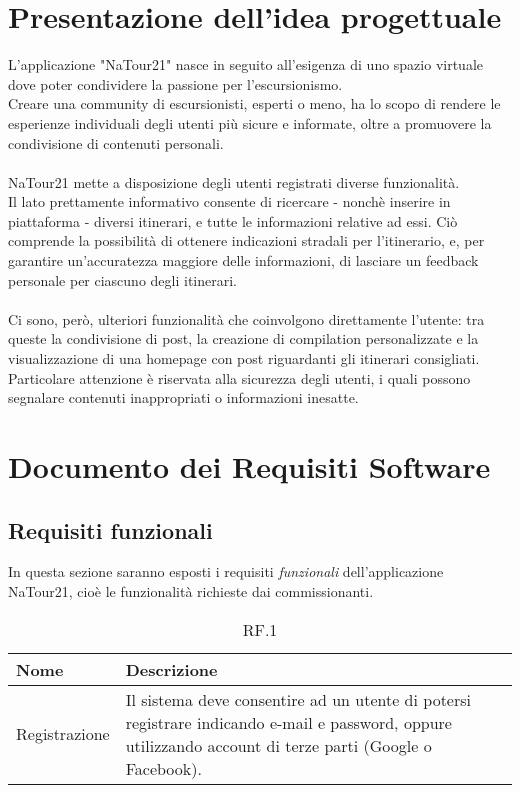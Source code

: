 \documentclass{natourDoc}
\begin{document}
	\section{Presentazione dell'idea progettuale}

	L'applicazione "NaTour21" nasce in seguito all'esigenza di uno spazio virtuale dove poter condividere la passione per l'escursionismo.\\
	Creare una community di escursionisti, esperti o meno, ha lo scopo di rendere le esperienze individuali degli utenti più sicure e informate, 
	oltre a promuovere la condivisione di contenuti personali.\\\\
	NaTour21 mette a disposizione degli utenti registrati diverse funzionalità.\\
	Il lato prettamente informativo consente di ricercare - nonchè inserire in piattaforma - diversi itinerari, e tutte le informazioni relative ad essi.
	Ciò comprende la possibilità di ottenere indicazioni stradali per l'itinerario, e, per garantire un'accuratezza maggiore delle informazioni, di lasciare 
	un feedback personale per ciascuno degli itinerari.\\\\
	Ci sono, però, ulteriori funzionalità che coinvolgono direttamente l'utente: tra queste la condivisione di post, la creazione di compilation personalizzate e 
	la visualizzazione di una homepage con post riguardanti gli itinerari consigliati.\\
	Particolare attenzione è riservata alla sicurezza degli utenti, i quali possono segnalare contenuti inappropriati o informazioni inesatte.
	
	
	\section{Documento dei Requisiti Software}
	\subsection{Requisiti funzionali}
	In questa sezione saranno esposti i requisiti \textit{funzionali} dell'applicazione NaTour21, cioè le funzionalità richieste dai commissionanti.
	
	\begin{table}[H]
		\centering
		\begin{tabular}{ |p{5cm}|p{10.3cm}| } 
			\hline
			\rowcolor{PineGreen!70}
			\textbf{Nome} & \textbf{Descrizione} \\
			\hline
			Registrazione & Il sistema deve consentire ad un utente di potersi registrare indicando e-mail e password, oppure utilizzando account di terze parti (Google o Facebook).\\ 
			\hline
		\end{tabular}
		\caption{RF.1}
		\label{table:1}
	\end{table}
	
\end{document}
